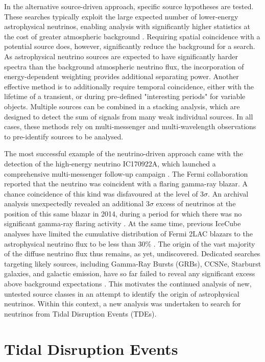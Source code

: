 \documentclass{PoS}
\begin{document}
In the alternative source-driven approach, specific source hypotheses are tested. These searches typically exploit the large expected number of lower-energy astrophysical neutrinos, enabling analysis with significantly higher statistics at the cost of greater atmospheric background \cite{Aartsen:2016oji}. Requiring spatial coincidence with a potential source does, however, significantly reduce the background for a search. As astrophysical neutrino sources are expected to have significantly harder spectra than the background atmospheric neutrino flux, the incorporation of energy-dependent weighting provides additional separating power. Another effective method is to additionally require temporal coincidence, either with the lifetime of a transient, or during  pre-defined "interesting periods" for variable objects.  Multiple sources can be combined in a stacking analysis, which are designed to detect the sum of signals from many weak individual sources. In all cases, these methods rely on multi-messenger and multi-wavelength observations to pre-identify sources to be analysed.

The most successful example of the neutrino-driven approach came with the detection of the high-energy neutrino IC170922A, which launched a comprehensive multi-messenger follow-up campaign \cite{IceCube:2018dnn}. The Fermi collaboration reported that the neutrino was coincident with a flaring gamma-ray blazar. A chance coincidence of this kind was disfavoured at the level of 3$\sigma$. An archival analysis unexpectedly revealed an additional 3$\sigma$ excess of neutrinos at the position of this same blazar in 2014, during a period for which there was no significant gamma-ray flaring activity \cite{IceCube:2018cha}. At the same time, previous IceCube analyses have limited the cumulative distribution of Fermi 2LAC blazars to the astrophysical neutrino flux to be less than 30\% \cite{Aartsen:2016lir}. The origin of the vast majority of the diffuse neutrino flux thus remains, as yet, undiscovered. Dedicated searches targeting likely sources, including Gamma-Ray Bursts (GRBs), CCSNe, Starburst galaxies, and galactic emission, have so far failed to reveal any significant excess above background expectations \cite{Stasik2018Search}. This motivates the continued analysis of new, untested source classes in an attempt to identify the origin of astrophysical neutrinos. Within this context, a new analysis was undertaken to search for neutrinos from Tidal Disruption Events (TDEs).

\section{Tidal Disruption Events}
\end{document}
